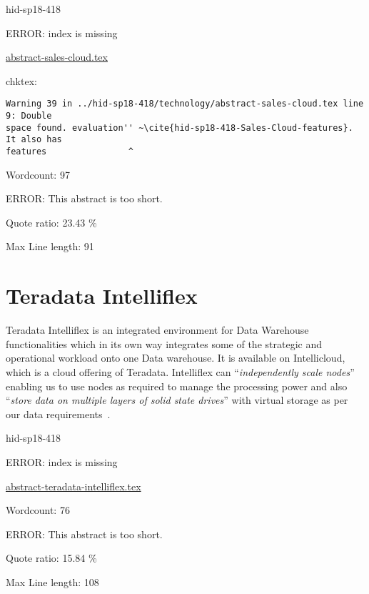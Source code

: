 \begin{IU}

hid-sp18-418

ERROR: index is missing

\href{https://github.com/cloudmesh-community/hid-sp18-418/blob/master//technology/abstract-sales-cloud.tex}{abstract-sales-cloud.tex}

 
chktex:
\begin{tiny}
\begin{verbatim}
Warning 39 in ../hid-sp18-418/technology/abstract-sales-cloud.tex line 9: Double
space found. evaluation'' ~\cite{hid-sp18-418-Sales-Cloud-features}. It also has
features                ^
\end{verbatim}
\end{tiny}

Wordcount: 97

ERROR: This abstract is too short.


Quote ratio: 23.43 \%
 
Max Line length: 91
\end{IU}

\section{Teradata Intelliflex}

Teradata Intelliflex is an integrated environment for Data Warehouse 
functionalities which in its own way integrates some of the strategic and 
operational workload onto one Data warehouse. It is available on Intellicloud, 
which is a cloud offering of Teradata. Intelliflex can \color{blue}``\emph{independently 
scale nodes}''\color{black} enabling us to use nodes as required to manage the processing 
power and also \color{blue}``\emph{store data on multiple layers of solid state drives}''\color{black} with 
virtual storage as per our data
requirements~\cite{hid-sp18-418-Teradata-Intelliflex-features}. 


\begin{IU}

hid-sp18-418

ERROR: index is missing

\href{https://github.com/cloudmesh-community/hid-sp18-418/blob/master//technology/abstract-teradata-intelliflex.tex}{abstract-teradata-intelliflex.tex}

 

Wordcount: 76

ERROR: This abstract is too short.


Quote ratio: 15.84 \%
 
Max Line length: 108
\end{IU}

